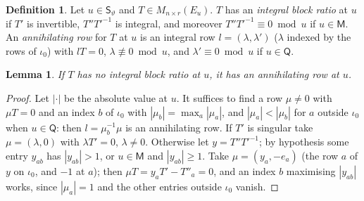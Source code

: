 \documentclass[10pt]{amsart}
\newtheorem{lemma}[theorem]{Lemma}
\theoremstyle{definition}
\newtheorem{definition}[theorem]{Definition}
\theoremstyle{remark}
\begin{document}
\begin{definition}\label{ppe:def-ratio}
Let $u\in\mathsf S_\vartheta$ and $T\in M_{n\times r}(E_u)$. $T$ has an \emph{integral block
ratio} at $u$ if $T'$ is invertible, $T''T'^{-1}$ is integral, and moreover $T''T'^{-1}\equiv0
\bmod u$ if $u\in\mathsf M$. An \emph{annihilating row} for $T$ at $u$ is an integral row
$l=(\lambda,\lambda')$ ($\lambda$ indexed by the rows of $\iota_0$) with $lT=0$, $\lambda\not
\equiv0\bmod u$, and $\lambda'\equiv0\bmod u$ if $u\in\mathsf Q$.
\end{definition}

\begin{lemma}\label{ppe:row}
If $T$ has no integral block ratio at $u$, it has an annihilating row at $u$.
\end{lemma}
\begin{proof}
Let $|\cdot|$ be the absolute value at $u$. It suffices to find a row $\mu\ne0$ with $\mu T=0$ and
an index $b$ of $\iota_0$ with $|\mu_b|=\max_a|\mu_a|$, and $|\mu_a|<|\mu_b|$ for $a$ outside
$\iota_0$ when $u\in\mathsf Q$: then $l=\mu_b^{-1}\mu$ is an annihilating row. If $T'$ is
singular take $\mu=(\lambda,0)$ with $\lambda T'=0$, $\lambda\ne0$. Otherwise let $y=T''T'^{-1}$;
by hypothesis some entry $y_{ab}$ has $|y_{ab}|>1$, or $u\in\mathsf M$ and $|y_{ab}|\ge1$. Take
$\mu=(y_a,-e_a)$ (the row $a$ of $y$ on $\iota_0$, and $-1$ at $a$); then $\mu T=y_aT'-T''_a=0$,
and an index $b$ maximising $|y_{ab}|$ works, since $|\mu_a|=1$ and the other entries outside
$\iota_0$ vanish.
\end{proof}
\end{document}

